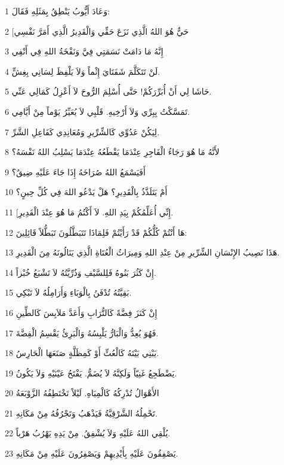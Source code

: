 \par 1 وَعَادَ أَيُّوبُ يَنْطِقُ بِمَثَلِهِ فَقَالَ:
\par 2 [حَيٌّ هُوَ اللهُ الَّذِي نَزَعَ حَقِّي وَالْقَدِيرُ الَّذِي أَمَرَّ نَفْسِي
\par 3 إِنَّهُ مَا دَامَتْ نَسَمَتِي فِيَّ وَنَفْخَةُ اللهِ فِي أَنْفِي
\par 4 لَنْ تَتَكَلَّمَ شَفَتَايَ إِثْماً وَلاَ يَلْفِظَ لِسَانِي بِغِشٍّ.
\par 5 حَاشَا لِي أَنْ أُبَرِّرَكُمْ! حَتَّى أُسْلِمَ الرُّوحَ لاَ أَعْزِلُ كَمَالِي عَنِّي.
\par 6 تَمَسَّكْتُ بِبِرِّي وَلاَ أَرْخِيهِ. قَلْبِي لاَ يُعَيِّرُ يَوْماً مِنْ أَيَّامِي.
\par 7 لِيَكُنْ عَدُوِّي كَالشِّرِّيرِ وَمُعَانِدِي كَفَاعِلِ الشَّرِّ.
\par 8 لأَنَّهُ مَا هُوَ رَجَاءُ الْفَاجِرِ عِنْدَمَا يَقْطَعُهُ عِنْدَمَا يَسْلِبُ اللهُ نَفْسَهُ؟
\par 9 أَفَيَسْمَعُ اللهُ صُرَاخَهُ إِذَا جَاءَ عَلَيْهِ ضِيقٌ؟
\par 10 أَمْ يَتَلَذَّذُ بِالْقَدِيرِ؟ هَلْ يَدْعُو اللهَ فِي كُلِّ حِينٍ؟
\par 11 [إِنِّي أُعَلِّمُكُمْ بِيَدِ اللهِ. لاَ أَكْتُمُ مَا هُوَ عِنْدَ الْقَدِيرِ.
\par 12 هَا أَنْتُمْ كُلُّكُمْ قَدْ رَأَيْتُمْ فَلِمَاذَا تَتَبَطَّلُونَ تَبَطُّلاً قَائِلِينَ:
\par 13 هَذَا نَصِيبُ الإِنْسَانِ الشِّرِّيرِ مِنْ عِنْدِ اللهِ وَمِيرَاثُ الْعُتَاةِ الَّذِي يَنَالُونَهُ مِنَ الْقَدِيرِ.
\par 14 إِنْ كَثُرَ بَنُوهُ فَلِلسَّيْفِ وَذُرِّيَّتُهُ لاَ تَشْبَعُ خُبْزاً.
\par 15 بَقِيَّتُهُ تُدْفَنُ بِالْوَبَاءِ وَأَرَامِلُهُ لاَ تَبْكِي.
\par 16 إِنْ كَنَزَ فِضَّةً كَالتُّرَابِ وَأَعَدَّ مَلاَبِسَ كَالطِّينِ
\par 17 فَهُوَ يُعِدُّ وَالْبَارُّ يَلْبِسُهُ وَالْبَرِئُ يَقْسِمُ الْفِضَّةَ.
\par 18 يَبْنِي بَيْتَهُ كَالْعُثِّ أَوْ كَمِظَلَّةٍ صَنَعَهَا الْحَارِسُ.
\par 19 يَضْطَجِعُ غَنِيّاً وَلَكِنَّهُ لاَ يُضَمُّ. يَفْتَحُ عَيْنَيْهِ وَلاَ يَكُونُ.
\par 20 الأَهْوَالُ تُدْرِكُهُ كَالْمِيَاهِ. لَيْلاً تَخْتَطِفُهُ الزَّوْبَعَةُ
\par 21 تَحْمِلُهُ الشَّرْقِيَّةُ فَيَذْهَبُ وَتَجْرُفُهُ مِنْ مَكَانِهِ.
\par 22 يُلْقِي اللهُ عَلَيْهِ وَلاَ يُشْفِقُ. مِنْ يَدِهِ يَهْرُبُ هَرْباً.
\par 23 يَصْفِقُونَ عَلَيْهِ بِأَيْدِيهِمْ وَيَصْفِرُونَ عَلَيْهِ مِنْ مَكَانِهِ.

